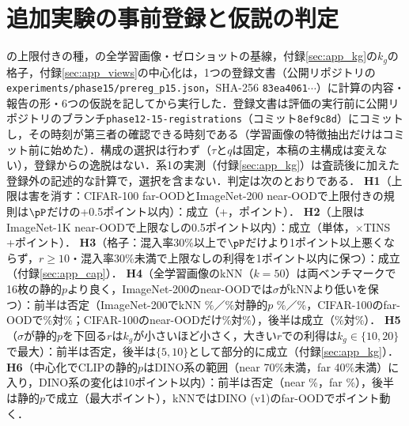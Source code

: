 \begin{table}[t]
\centering
\caption{種の上限$\tau{=}0.05$の規則の格子（\FPR{}[\%]，単体，3回の平均）．Storey型・単純BH法はそれぞれ上限なし／あり．種はDINOv3 L/16のビューで上限付きStorey型に選ばれた枚数（2つの折の合計）とそのうちIDの割合（\%）．}
\label{tab:caprec}
\vspace{1.5mm}

\end{table}

\section{追加実験の事前登録と仮説の判定}
\label{sec:app_hyp}
の上限付きの種，の全学習画像・ゼロショットの基線，付録\ref{sec:app_kg}の$k_g$の格子，付録\ref{sec:app_views}の中心化は，1つの登録文書（公開リポジトリの\texttt{experiments/phase15/prereg\_p15.json}，SHA-256 \texttt{83ea4061}$\cdots$）に計算の内容・報告の形・6つの仮説を記してから実行した．登録文書は評価の実行前に公開リポジトリのブランチ\texttt{phase12-15-registrations}（コミット\texttt{8ef9c8d}）にコミットし，その時刻が第三者の確認できる時刻である（学習画像の特徴抽出だけはコミット前に始めた）．構成の選択は行わず（$\tau$と$q$は固定，本稿の主構成は変えない），登録からの逸脱はない．系1の実測（付録\ref{sec:app_kg}）は査読後に加えた登録外の記述的な計算で，選択を含まない．判定は次のとおりである．
\textbf{H1}（上限は害を消す：CIFAR-100 far-OODとImageNet-200 near-OODで上限付きの規則は$\pP$だけの+0.5ポイント以内）：成立（+\NCifarStoreycFarDfprVsLp{}，\NInTwoZeroZeroStoreycNearDfprVsLp{}ポイント）．
\textbf{H2}（上限はImageNet-1K near-OODで上限なしの0.5ポイント以内）：成立（単体\NCapStoreycAloneNearDfprVsStorey{}，$\times$TINS +\NCapStoreycNearDfprVsStorey{}ポイント）．
\textbf{H3}（格子：混入率30\%以上で$\pP$だけより1ポイント以上悪くならず，$r\ge10$・混入率30\%未満で上限なしの利得を1ポイント以内に保つ）：成立（付録\ref{sec:app_cap}）．
\textbf{H4}（全学習画像のkNN（$k{=}50$）は両ベンチマークで16枚の静的$p$より良く，ImageNet-200のnear-OODでは$\sigma$がkNNより低い\FPR{}を保つ）：前半は否定（ImageNet-200でkNN \NInTwoZeroZeroKnnAllKFiveZeroNearFpr\%／\NInTwoZeroZeroKnnAllKFiveZeroFarFpr\%対静的$p$ \NInTwoZeroZeroStaticNearFpr\%／\NInTwoZeroZeroStaticFarFpr\%，CIFAR-100のfar-OODで\NCifarKnnAllKFiveZeroFarFpr\%対\NCifarStaticFarFpr\%；CIFAR-100のnear-OODだけ\NCifarKnnAllKFiveZeroNearFpr\%対\NCifarStaticNearFpr\%），後半は成立（\NInTwoZeroZeroMainNearFpr\%対\NInTwoZeroZeroKnnAllKFiveZeroNearFpr\%）．
\textbf{H5}（$\sigma$が静的$p$を下回る$r$は$k_g$が小さいほど小さく，大きい$r$での利得は$k_g\in\{10,20\}$で最大）：前半は否定，後半は$\{5,10\}$として部分的に成立（付録\ref{sec:app_kg}）．
\textbf{H6}（中心化でCLIPの静的$p$はDINO系の範囲（near 70\%未満，far 40\%未満）に入り，DINO系の変化は10ポイント以内）：前半は否定（near \NViewClipStaticcNearFpr\%，far \NViewClipStaticcFarFpr\%），後半は静的$p$で成立（最大\NViewsDinoCentredMaxabsFpr{}ポイント），kNNではDINO (v1)のfar-OODで\NViewsDinoKnncentredMaxabsFpr{}ポイント動く．
